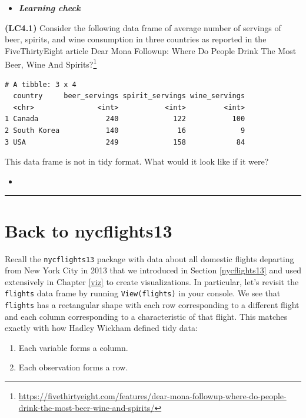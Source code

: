 \documentclass[12pt,]{krantz}
\providecommand{\tightlist}{%
  \setlength{\itemsep}{0pt}\setlength{\parskip}{0pt}}
\renewcommand{\href}[2]{#2\footnote{\url{#1}}}
\newenvironment{rmdblock}[1]
  {\begin{shaded*}
  \begin{itemize}
  \renewcommand{\labelitemi}{
    \raisebox{-.7\height}[0pt][0pt]{
    }
  }
  \item
  }
  {
  \end{itemize}
  \end{shaded*}
  }
\newenvironment{learncheck}
  {\begin{rmdblock}{warning}}
  {\end{rmdblock}}
\begin{document}
\begin{learncheck}
\textbf{\emph{Learning check}}
\end{learncheck}

\textbf{(LC4.1)} Consider the following data frame of average number of
servings of beer, spirits, and wine consumption in three countries as
reported in the FiveThirtyEight article
\href{https://fivethirtyeight.com/features/dear-mona-followup-where-do-people-drink-the-most-beer-wine-and-spirits/}{Dear
Mona Followup: Where Do People Drink The Most Beer, Wine And Spirits?}

\begin{verbatim}
# A tibble: 3 x 4
  country     beer_servings spirit_servings wine_servings
  <chr>               <int>           <int>         <int>
1 Canada                240             122           100
2 South Korea           140              16             9
3 USA                   249             158            84
\end{verbatim}

This data frame is not in tidy format. What would it look like if it
were?

\begin{learncheck}

\end{learncheck}

\begin{center}\rule{0.5\linewidth}{\linethickness}\end{center}

\section{Back to nycflights13}\label{back-to-nycflights13}

Recall the \texttt{nycflights13} package with data about all domestic
flights departing from New York City in 2013 that we introduced in
Section \ref{nycflights13} and used extensively in Chapter \ref{viz} to
create visualizations. In particular, let's revisit the \texttt{flights}
data frame by running \texttt{View(flights)} in your console. We see
that \texttt{flights} has a rectangular shape with each row
corresponding to a different flight and each column corresponding to a
characteristic of that flight. This matches exactly with how Hadley
Wickham defined tidy data:

\begin{enumerate}
\def\labelenumi{\arabic{enumi}.}
\tightlist
\item
  Each variable forms a column.
\item
  Each observation forms a row.
\end{enumerate}
\end{document}
